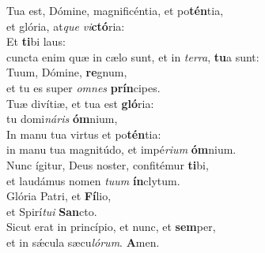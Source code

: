 \evenverse Tua est, Dómine, magnificéntia, et po\textbf{tén}tia,~\*\\
\evenverse et glória, at\textit{que} \textit{vi}\textbf{ctó}ria:\\
\oddverse Et \textbf{ti}bi laus:~\*\\
\oddverse cuncta enim quæ in cælo sunt, et in \textit{ter}\textit{ra}, \textbf{tu}a sunt:\\
\evenverse Tuum, Dómine, \textbf{re}gnum,~\*\\
\evenverse et tu es super \textit{om}\textit{nes} \textbf{prín}cipes.\\
\oddverse Tuæ divítiæ, et tua est \textbf{gló}ria:~\*\\
\oddverse tu domi\textit{ná}\textit{ris} \textbf{óm}nium,\\
\evenverse In manu tua virtus et po\textbf{tén}tia:~\*\\
\evenverse in manu tua magnitúdo, et impé\textit{ri}\textit{um} \textbf{óm}nium.\\
\oddverse Nunc ígitur, Deus noster, confitémur \textbf{ti}bi,~\*\\
\oddverse et laudámus nomen \textit{tu}\textit{um} \textbf{ín}clytum.\\
\evenverse Glória Patri, et \textbf{Fí}lio,~\*\\
\evenverse et Spirí\textit{tu}\textit{i} \textbf{San}cto.\\
\oddverse Sicut erat in princípio, et nunc, et \textbf{sem}per,~\*\\
\oddverse et in sǽcula sæcu\textit{ló}\textit{rum}. \textbf{A}men.\\

